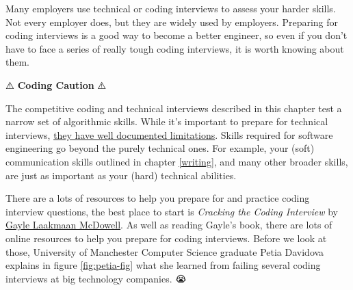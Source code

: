 \documentclass[
]{book}
\begin{document}
Many employers use technical or coding interviews to assess your harder skills. Not every employer does, but they are widely used by employers. Preparing for coding interviews is a good way to become a better engineer, so even if you don't have to face a series of really tough coding interviews, it is worth knowing about them.

⚠️ \textbf{Coding Caution} ⚠️

The competitive coding and technical interviews described in this chapter test a narrow set of algorithmic skills. While it's important to prepare for technical interviews, \href{https://www.quora.com/What-are-some-common-criticisms-of-Cracking-the-Coding-interview}{they have well documented limitations}. \citep{murashenkov} Skills required for software engineering go beyond the purely technical ones. For example, your (soft) communication skills outlined in chapter \ref{writing}, and many other broader skills, are just as important as your (hard) technical abilities.

There are a lots of resources to help you prepare for and practice coding interview questions, the best place to start is \emph{Cracking the Coding Interview} by \href{https://en.wikipedia.org/wiki/Gayle_Laakmann_McDowell}{Gayle Laakmaan McDowell}. \citep{cracking} As well as reading Gayle's book, there are lots of online resources to help you prepare for coding interviews. Before we look at those, University of Manchester Computer Science graduate Petia Davidova explains in figure \ref{fig:petia-fig} what she learned from failing several coding interviews at big technology companies. 😭
\end{document}
